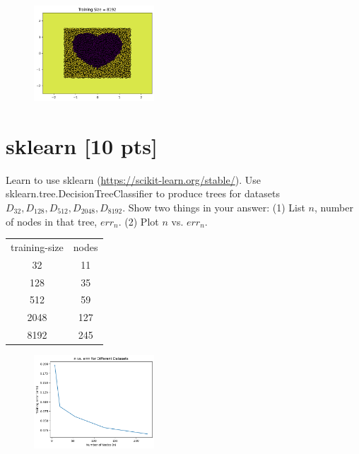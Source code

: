 \documentclass[a4paper]{article}
\theoremstyle{definition}
\begin{document}
\begin{enumerate}
  
  \begin{figure}[H]
  	\centering
  	\includegraphics[width=0.4\textwidth]{q77.png}  
  	\captionsetup{labelformat=empty}
  	\caption{}
  	\label{fig:my_label}
  \end{figure}
  
\end{enumerate}

\section{sklearn [10 pts]}
Learn to use sklearn (\url{https://scikit-learn.org/stable/}).
Use sklearn.tree.DecisionTreeClassifier to produce trees for datasets $D_{32}, D_{128}, D_{512}, D_{2048}, D_{8192}$.  Show two things in your answer: (1) List $n$, number of nodes in that tree, $err_n$. (2) Plot $n$ vs. $err_n$.


\begin{tabular}{ c c }
	training-size &  nodes \\
	32 &  11\\ 
	128 & 35\\
	512 & 59 \\
	2048 & 127  \\
	8192 & 245
\end{tabular}


\begin{figure}[H]
	\centering
	\includegraphics[width=0.4\textwidth]{q81.png}  
	\captionsetup{labelformat=empty}
	\caption{}
	\label{fig:my_label}
\end{figure}
\end{document}
